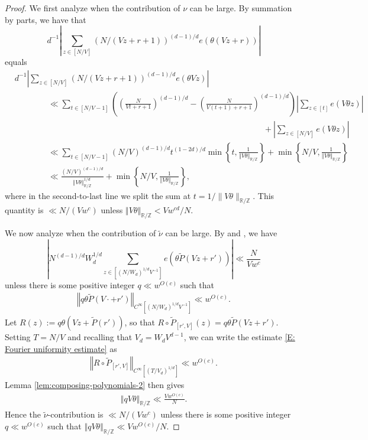 \documentclass[11pt]{amsart}
\theoremstyle{definition}
\newcommand{\R}{{\mathbb R}}
\newcommand{\Z}{{\mathbb Z}}
\newcommand{\norm}[1]{\left\Vert #1\right\Vert}
\newcommand{\abs}[1]{\mathopen{}\left| #1\mathclose{}\right|}
\begin{document}
\begin{proof}
We first analyze when the contribution of $\nu$ can be large. By summation by parts, we have that
$$d^{-1}\abs{\sum_{z \in [N/V]} (N/(Vz+r+1))^{(d-1)/d}e(\theta(Vz+r))}$$
equals
\begin{align*}
 &d^{-1}\abs{\sum_{z \in [N/V]} (N/(Vz+r+1))^{(d-1)/d}e(\theta Vz)}\\
 &\qquad\qquad\ll \sum_{t \in [N/V-1]} \left(\left(\frac{N}{Vt+r+1}\right)^{(d-1)/d}-\left(\frac{N}{V(t+1)+r+1}\right)^{(d-1)/d}\right) \abs{\sum_{z \in [t]}e(V\theta z)}\\
 &\qquad\qquad\qquad\qquad\qquad\qquad\qquad\qquad\qquad\qquad\qquad\qquad\qquad\qquad\qquad+\abs{\sum_{z \in [N/V]}e(V\theta z)}\\
 &\qquad\qquad\ll \sum_{t \in [N/V-1]} (N/V)^{(d-1)/d} t^{(1-2d)/d} \min \left\{ t, \frac{1}{\norm{V\theta}_{\mathbb{R}/\mathbb{Z}}} \right\}+\min \left\{N/V,\frac{1}{\norm{V\theta}_{\mathbb{R}/\mathbb{Z}}}\right\}\\
 &\qquad\qquad\ll \frac{(N/V)^{(d-1)/d}}{\norm{V\theta}_{\mathbb{R}/\mathbb{Z}}^{1/d}} + \min \left\{N/V,\frac{1}{\norm{V\theta}_{\mathbb{R}/\mathbb{Z}}}\right\},
\end{align*}
where in the second-to-last line we split the sum at $t = 1/\|V\theta\|_{\mathbb{R}/\mathbb{Z}}$.  This quantity is $\ll N/(V w^c)$ unless $\norm{V\theta}_{\mathbb{R}/\mathbb{Z}}<V w^{cd}/N$.

We now analyze when the contribution of $\tilde{\nu}$ can be large.  By \cite[Proposition 4.3]{GT12} and \cite[Lemma A.10]{Leng23b}, we have
$$\abs{N^{(d-1)/d}W_d^{1/d} \sum_{z \in [(N/W_d)^{1/d}V^{-1}]}e(\theta \widetilde P(Vz+r'))} \ll \frac{N}{Vw^c}$$
unless there is some positive integer $q \ll w^{O(c)}$ such that
\begin{align}\label{E: Fourier uniformity estimate}
    \norm{q\theta\widetilde P(V \cdot +r')}_{C^\infty [(N/W_d)^{1/d}V^{-1}]} \ll w^{O(c)}.
\end{align}
Let $R(z):= q\theta(Vz + \widetilde P(r'))$, so that $R\circ \widetilde P_{[r',V]}(z) = q\theta\widetilde P(Vz +r')$. Setting $T=N/V$ and recalling that $V_d = W_d V^{d-1}$, we can write the estimate \eqref{E: Fourier uniformity estimate} as
\begin{align*}
    \norm{R\circ \widetilde P_{[r',V]}}_{C^\infty [(T/V_d)^{1/d}]} \ll w^{O(c)}.
\end{align*}
Lemma \ref{lem:composing-polynomials-2} then gives
\begin{align*}
    \norm{qV\theta}_{\R/\Z}\ll \frac{V w^{O(c)}}{N}.
\end{align*}
Hence the $\tilde{\nu}$-contribution is $\ll N/(V w^c)$ unless there is some positive integer $q \ll w^{O(c)}$ such that $\norm{qV\theta}_{\mathbb{R}/\mathbb{Z}} \ll Vw^{O(c)}/N$.



\end{proof}
\end{document}
